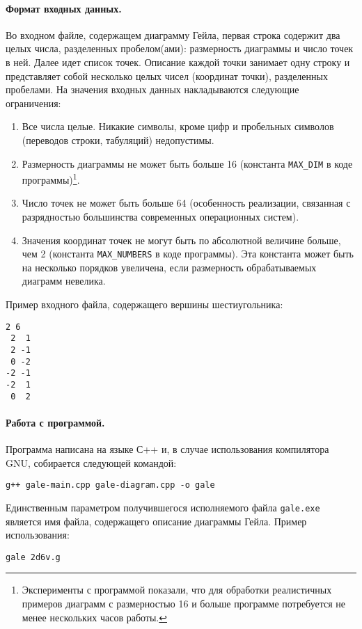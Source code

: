 \documentclass[12pt]{article}
\begin{document}
\paragraph{Формат входных данных.}
Во входном файле, содержащем диаграмму Гейла, первая строка содержит два целых числа, разделенных пробелом(ами): размерность диаграммы и число точек в ней. Далее идет список точек. Описание каждой точки занимает одну строку и представляет собой несколько целых чисел (координат точки), разделенных пробелами. На значения входных данных накладываются следующие ограничения:
\begin{enumerate}
	\item Все числа целые. Никакие символы, кроме цифр и пробельных символов (переводов строки, табуляций) недопустимы.
	\item Размерность диаграммы не может быть больше 16 (константа \texttt{MAX\_DIM} в коде программы)\footnote{Эксперименты с программой показали, что для обработки реалистичных примеров диаграмм с размерностью 16 и больше программе потребуется не менее нескольких часов работы.}. 
	\item Число точек не может быть больше 64 (особенность реализации, связанная с разрядностью большинства современных операционных систем).
	\item Значения координат точек не могут быть по абсолютной величине больше, чем 2 (константа \texttt{MAX\_NUMBERS} в коде программы). Эта константа может быть на несколько порядков увеличена, если размерность обрабатываемых диаграмм невелика.
\end{enumerate}
Пример входного файла, содержащего вершины шестиугольника:
\begin{verbatim}
2 6
 2  1
 2 -1
 0 -2
-2 -1
-2  1
 0  2
\end{verbatim}

\paragraph{Работа с программой.}
Программа написана на языке С++ и, в случае использования компилятора GNU, собирается следующей командой:
\begin{verbatim}
g++ gale-main.cpp gale-diagram.cpp -o gale
\end{verbatim}
Единственным параметром получившегося исполняемого файла \texttt{gale.exe} является имя файла, содержащего описание диаграммы Гейла. Пример использования:
\begin{verbatim}
gale 2d6v.g
\end{verbatim}
\end{document}
